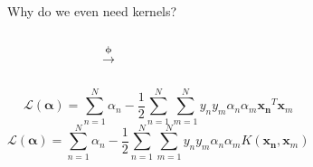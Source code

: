\documentclass[9.5pt]{beamer}
\begin{document}
    \begin{frame}{Why do we even need kernels?}
        \begin{columns}[onlytextwidth]
            \begin{figure}
                \centering
            \end{figure}
            \LARGE
            \[\mathbf{\xrightarrow{\phi}}\]
            \begin{figure}
                \centering
            \end{figure}
        \end{columns}
        \bigskip
        \begin{columns}[onlytextwidth]
            \tiny
            \[\mathcal{L}(\mathbf{\alpha}) = \sum_{n=1}^{N} \alpha_n-\frac{1}{2}\sum_{n=1}^{N}\sum_{m=1}^{N} y_ny_m\alpha_n\alpha_m\mathbf{x_n}^T \mathbf{x}_m\]
            \tiny
            \[\mathcal{L}(\mathbf{\alpha}) = \sum_{n=1}^{N} \alpha_n-\frac{1}{2}\sum_{n=1}^{N}\sum_{m=1}^{N} y_ny_m\alpha_n\alpha_m K( \mathbf{x_n} , \mathbf{x}_m)\]
        \end{columns}
    \end{frame}
\end{document}
